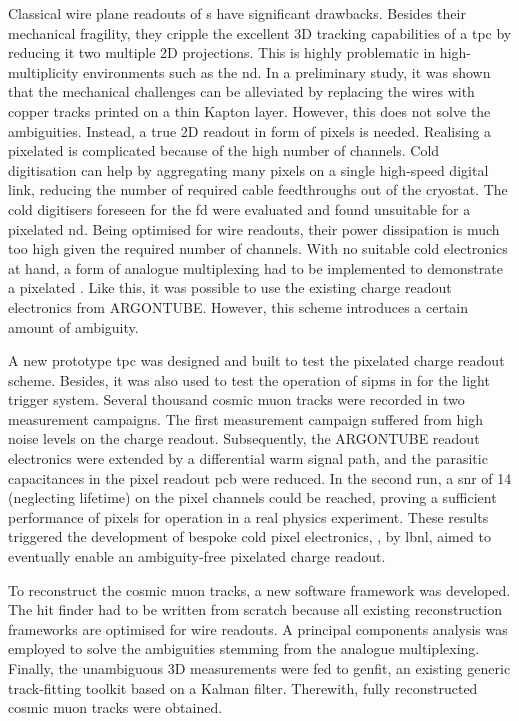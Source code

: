 Classical wire plane readouts of \lartpc{}s have significant drawbacks.
Besides their mechanical fragility, they cripple the excellent 3D tracking capabilities of a \gls{tpc} by reducing it two multiple 2D projections.
This is highly problematic in high-multiplicity environments such as the \dune{} \gls{nd}.
In a preliminary study, it was shown that the mechanical challenges can be alleviated by replacing the wires with copper tracks printed on a thin Kapton layer.
However, this does not solve the ambiguities.
Instead, a true 2D readout in form of pixels is needed.
Realising a pixelated \lartpc{} is complicated because of the high number of channels.
Cold digitisation can help by aggregating many pixels on a single high-speed digital link, reducing the number of required cable feedthroughs out of the cryostat.
The cold digitisers foreseen for the \dune{} \gls{fd} were evaluated and found unsuitable for a pixelated \gls{nd}.
Being optimised for wire readouts, their power dissipation is much too high given the required number of channels.
With no suitable cold electronics at hand, a form of analogue multiplexing had to be implemented to demonstrate a pixelated \lartpc{}.
Like this, it was possible to use the existing charge readout electronics from ARGONTUBE.
However, this scheme introduces a certain amount of ambiguity.

A new prototype \gls{tpc} was designed and built to test the pixelated charge readout scheme.
Besides, it was also used to test the operation of \glspl{sipm} in \lar{} for the light trigger system.
Several thousand cosmic muon tracks were recorded in two measurement campaigns.
The first measurement campaign suffered from high noise levels on the charge readout.
Subsequently, the ARGONTUBE readout electronics were extended by a differential warm signal path, and the parasitic capacitances in the pixel readout \gls{pcb} were reduced.
In the second run, a \gls{snr} of \num{14} (neglecting lifetime) on the pixel channels could be reached, proving a sufficient performance of pixels for operation in a real physics experiment.
These results triggered the development of bespoke cold pixel electronics, \larpix{}, by \gls{lbnl}, aimed to eventually enable an ambiguity-free pixelated \lartpc{} charge readout.

To reconstruct the cosmic muon tracks, a new software framework was developed.
The hit finder had to be written from scratch because all existing \lartpc{} reconstruction frameworks are optimised for wire readouts.
A principal components analysis was employed to solve the ambiguities stemming from the analogue multiplexing.
Finally, the unambiguous 3D measurements were fed to \gls{genfit}, an existing generic track-fitting toolkit based on a Kalman filter.
Therewith, fully reconstructed cosmic muon tracks were obtained.

